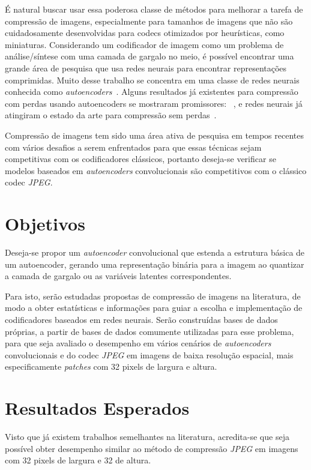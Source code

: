É natural buscar usar essa poderosa classe de métodos para melhorar a tarefa de compressão de imagens, especialmente para tamanhos de imagens que não são cuidadosamente desenvolvidas para codecs otimizados por heurísticas, como miniaturas. Considerando um codificador de imagem como um problema de análise/síntese com uma camada de gargalo no meio, é possível encontrar uma grande área de pesquisa que usa redes neurais para encontrar representações comprimidas. Muito desse trabalho se concentra em uma classe de redes neurais conhecida como \emph{autoencoders}~\cite{autoencoder2011}. Alguns resultados já existentes para compressão com perdas usando autoencoders se mostraram promissores: ~\cite{gregor2016towards, toderici2017full, toderici2015variable}, e redes neurais já atingiram o estado da arte para compressão sem perdas~\cite{mentzer2019, theis2015generative}. 

Compressão de imagens tem sido uma área ativa de pesquisa em tempos recentes com vários desafios a serem enfrentados para que essas técnicas sejam competitivas com os codificadores clássicos, portanto deseja-se verificar se modelos baseados em \textit{autoencoders} convolucionais são competitivos com o clássico codec \textit{JPEG}. 
\section{Objetivos}
\label{sec:objetivos}
Deseja-se propor um \textit{autoencoder} convolucional que estenda a estrutura básica de um autoencoder, gerando uma representação binária para a imagem ao quantizar a camada de gargalo ou as variáveis latentes correspondentes.

Para isto, serão estudadas propostas de compressão de imagens na literatura, de modo a obter estatísticas e informações para guiar a escolha e implementação de codificadores baseados em redes neurais. Serão construídas bases de dados próprias, a partir de bases de dados comumente utilizadas para esse problema, para que seja avaliado o desempenho em vários cenários de \textit{autoencoders} convolucionais e do codec \textit{JPEG} em imagens de baixa resolução espacial, mais especificamente \textit{patches} com 32 pixels de largura e altura.
\section{Resultados Esperados}
\label{sec:expectativa}
Visto que já existem trabalhos semelhantes na literatura, acredita-se que seja possível obter desempenho similar ao método de compressão \textit{JPEG} em imagens com 32 pixels de largura e 32 de altura.

